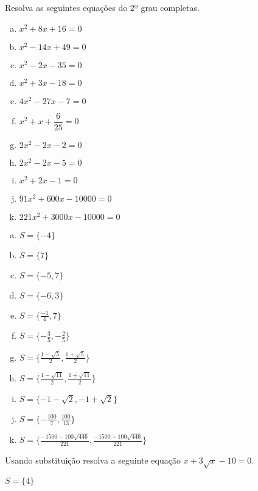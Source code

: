\begin{exer}
Resolva as seguintes equações do 2º grau completas.
\begin{multicols}{2}
\begin{enumerate}[a)]
\item $x^2 + 8x + 16=0$
\item $x^2 - 14x + 49=0$
\item $x^2 - 2x - 35=0$
\item $x^2 + 3x - 18=0$
\item $4x^2 - 27x - 7=0$
\item $x^2 + x + \dfrac{6}{25}=0$
\item $2x^2 - 2x - 2=0$
\item $2x^2 - 2x - 5=0$
\item $x^2 + 2x - 1=0$
\item $91x^2 + 600x - 10000=0$
\item $221x^2 + 3000x - 10000=0$
\end{enumerate}
\end{multicols}
\end{exer}
\begin{resp}
\begin{multicols}{2}
\begin{enumerate}[a)]
\item $S= \{ -4 \} $
\item $S= \{ 7 \} $
\item $S= \{ -5, 7 \} $
\item $S= \{ -6, 3 \} $
\item $S= \{ \frac{-1}{4}, 7\} $
\item $S= \{ -\frac{3}{5}, -\frac{2}{5} \} $
\item $S= \{ \frac{1- \sqrt{5}}{2}, \frac{1 + \sqrt{5}}{2} \} $
\item $S= \{ \frac{1- \sqrt{11}}{2}, \frac{1 + \sqrt{11}}{2}\} $
\item $S= \{ -1 - \sqrt{2}, -1 + \sqrt{2} \} $
\item $S= \{ -\frac{100}{7}, \frac{100}{13}\} $
\item $S= \{ \frac{-1500 - 100\sqrt{446}}{221}, \frac{-1500 + 100\sqrt{446}}{221}\} $
\end{enumerate}
\end{multicols}
\end{resp}

\begin{exer}
Usando substituição resolva a seguinte equação $x + 3\sqrt{x} - 10=0$.
\end{exer}
\begin{resp}
  $S= \{4 \}$
\end{resp}

